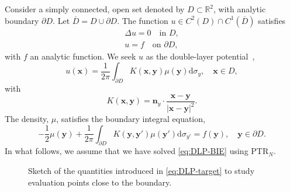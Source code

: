 \documentclass{article}[12pt]
\numberwithin{equation}{section}
\begin{document}
Consider a simply connected, open set denoted by
$D \subset \mathbb{R}^2$, with analytic boundary $\partial D$. Let
$\overline{D} = D \cup \partial D$. The function
$u \in C^2(D) \cap C^1(\overline{D})$ satisfies
\begin{subequations}
  \begin{gather}
    \Delta u = 0 \quad \text{in $D$}, \label{eq:3.1a}\\
    u = f \quad \text{on $\partial D$}, \label{eq:3.1b}
  \end{gather}
  \label{eq:3.1}
\end{subequations}
with $f$ an analytic function. We seek $u$ as the
double-layer potential~\cite{kress1999linear},
\begin{equation}
  u(\mathbf{x}) = \frac{1}{2\pi} \int_{\partial D}
  K(\mathbf{x},\mathbf{y})\mu(\mathbf{y})\mathrm{d}\sigma_{y}, \quad
  \mathbf{x} \in D,
  \label{eq:DLP}
\end{equation}
with
\begin{equation}
  K(\mathbf{x},\mathbf{y})=\mathbf{n}_{y} \cdot \frac{\mathbf{x} -
    \mathbf{y}}{| \mathbf{x} - \mathbf{y} |^{2}}.
  \label{eq:DLP-kernel}
\end{equation}
The density, $\mu$, satisfies the boundary integral equation,
\begin{equation}
  - \frac{1}{2} \mu(\mathbf{y}) + \frac{1}{2\pi} \int_{\partial D}
  K(\mathbf{y},\mathbf{y'})\mu(\mathbf{y}') \mathrm{d}\sigma_{y'} =
  f(\mathbf{y}), \quad \mathbf{y} \in \partial D.
  \label{eq:DLP-BIE}
\end{equation}
In what follows, we assume that we have solved \eqref{eq:DLP-BIE}
using PTR$_{N}$.

\begin{figure}[t]
  \centering
  \def\svgwidth{0.4\columnwidth} 
  
  \caption{Sketch of the quantities introduced in
    \eqref{eq:DLP-target} to study evaluation points close to the
    boundary.}
  \label{fig:sketch}
\end{figure}
\end{document}
